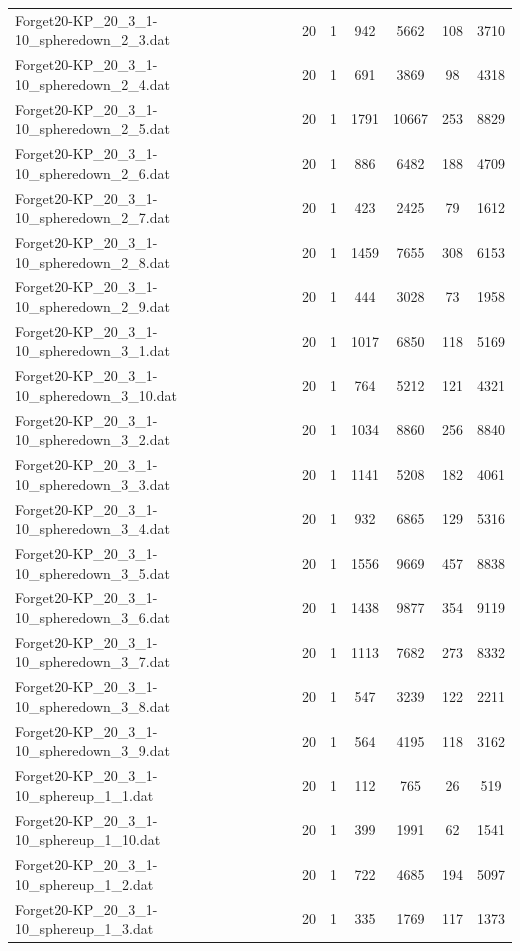 \begin{table}[!ht]
\begin{tabular}{lcccccc}
Forget20-KP\_20\_3\_1-10\_spheredown\_2\_3.dat & 20 & 1 & 942 & 5662 & 108 & 3710 \\
Forget20-KP\_20\_3\_1-10\_spheredown\_2\_4.dat & 20 & 1 & 691 & 3869 & 98 & 4318 \\
Forget20-KP\_20\_3\_1-10\_spheredown\_2\_5.dat & 20 & 1 & 1791 & 10667 & 253 & 8829 \\
Forget20-KP\_20\_3\_1-10\_spheredown\_2\_6.dat & 20 & 1 & 886 & 6482 & 188 & 4709 \\
Forget20-KP\_20\_3\_1-10\_spheredown\_2\_7.dat & 20 & 1 & 423 & 2425 & 79 & 1612 \\
Forget20-KP\_20\_3\_1-10\_spheredown\_2\_8.dat & 20 & 1 & 1459 & 7655 & 308 & 6153 \\
Forget20-KP\_20\_3\_1-10\_spheredown\_2\_9.dat & 20 & 1 & 444 & 3028 & 73 & 1958 \\
Forget20-KP\_20\_3\_1-10\_spheredown\_3\_1.dat & 20 & 1 & 1017 & 6850 & 118 & 5169 \\
Forget20-KP\_20\_3\_1-10\_spheredown\_3\_10.dat & 20 & 1 & 764 & 5212 & 121 & 4321 \\
Forget20-KP\_20\_3\_1-10\_spheredown\_3\_2.dat & 20 & 1 & 1034 & 8860 & 256 & 8840 \\
Forget20-KP\_20\_3\_1-10\_spheredown\_3\_3.dat & 20 & 1 & 1141 & 5208 & 182 & 4061 \\
Forget20-KP\_20\_3\_1-10\_spheredown\_3\_4.dat & 20 & 1 & 932 & 6865 & 129 & 5316 \\
Forget20-KP\_20\_3\_1-10\_spheredown\_3\_5.dat & 20 & 1 & 1556 & 9669 & 457 & 8838 \\
Forget20-KP\_20\_3\_1-10\_spheredown\_3\_6.dat & 20 & 1 & 1438 & 9877 & 354 & 9119 \\
Forget20-KP\_20\_3\_1-10\_spheredown\_3\_7.dat & 20 & 1 & 1113 & 7682 & 273 & 8332 \\
Forget20-KP\_20\_3\_1-10\_spheredown\_3\_8.dat & 20 & 1 & 547 & 3239 & 122 & 2211 \\
Forget20-KP\_20\_3\_1-10\_spheredown\_3\_9.dat & 20 & 1 & 564 & 4195 & 118 & 3162 \\
Forget20-KP\_20\_3\_1-10\_sphereup\_1\_1.dat & 20 & 1 & 112 & 765 & 26 & 519 \\
Forget20-KP\_20\_3\_1-10\_sphereup\_1\_10.dat & 20 & 1 & 399 & 1991 & 62 & 1541 \\
Forget20-KP\_20\_3\_1-10\_sphereup\_1\_2.dat & 20 & 1 & 722 & 4685 & 194 & 5097 \\
Forget20-KP\_20\_3\_1-10\_sphereup\_1\_3.dat & 20 & 1 & 335 & 1769 & 117 & 1373 \\

\end{tabular}
\end{table}
